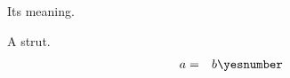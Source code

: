 \documentclass{IEEEtran}
\begin{document}
\begin{LaTeXdescription}
\item[Term] Its meaning.
\end{LaTeXdescription}
A\IEEEstrut[2ex][1ex]{} strut. \IEEEeqnarraystrutmode
\begin{eqnarray*}
a &=& b \yesnumber
\end{eqnarray*}
\end{document}
